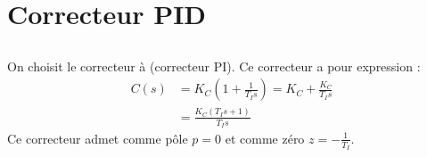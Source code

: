 \documentclass{article}
\begin{document}
\section{Correcteur PID}
\subsection{}
On choisit le correcteur à (correcteur PI).
Ce correcteur a pour expression :
\begin{align*}
    C(s)&=K_C\left(1+\frac{1}{T_Is}\right)=K_C+\frac{K_C}{T_Is}\\
    &=\frac{K_C(T_Is+1)}{T_Is}
\end{align*}
Ce correcteur admet comme pôle $p=0$ et comme zéro $z=-\frac{1}{T_I}$.
\end{document}
